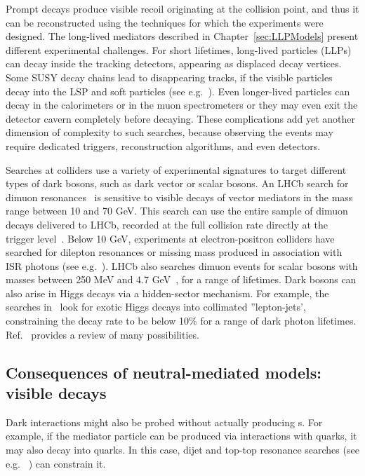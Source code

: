 Prompt decays produce visible recoil originating at the collision point, and thus it can be reconstructed using the techniques for which the experiments were designed.
The long-lived mediators described in Chapter~\ref{sec:LLPModels} present different experimental challenges. 
For short lifetimes, long-lived particles (LLPs) can decay inside the tracking detectors, appearing as displaced decay vertices. 
Some SUSY decay chains lead to disappearing tracks, if the visible particles decay into the LSP and soft particles (see e.g.~\cite{Aaboud:2017mpt, CMS:2014gxa}).
Even longer-lived particles can decay in the calorimeters or in the muon spectrometers
or they may even exit the detector cavern completely before decaying. 
These complications add yet another dimension of complexity to such searches, because observing the events may require dedicated triggers, reconstruction algorithms, and even detectors\cite{Ball:2016zrp,Chou:2016lxi}. 

Searches at colliders use a variety of experimental signatures to target different types of dark bosons, such as dark vector or scalar bosons.
An LHCb search for dimuon resonances~\cite{Aaij:2017rft} is sensitive to visible decays of vector mediators in the mass range between 10 and 70 GeV.
This search can use the entire sample of dimuon decays delivered to LHCb, recorded at the full collision rate directly at the trigger level~\cite{Aaij:2016rxn}. 
Below 10 GeV, experiments at electron-positron colliders have searched for dilepton resonances or missing mass produced in association with ISR photons (see e.g.~\cite{Lees:2014xha,Lees:2017lec}).
LHCb also searches dimuon events for scalar bosons with masses between 250 MeV and 4.7 GeV~\cite{Aaij:2016qsm}, for a range of lifetimes.
Dark bosons can also arise in Higgs decays via a hidden-sector mechanism.
For example, the searches in~\cite{ATLAS:2016jza,CMS-PAS-HIG-16-035} look for exotic Higgs decays into collimated ''lepton-jets', constraining the decay rate to be below 10\% for a range of dark photon lifetimes. 
Ref.~\cite{Curtin:2014cca} provides a review of many possibilities.

\subsection{Consequences of neutral-mediated models: visible decays}
\label{sec:MediatorSearches}
\label{sub:twoBody}

Dark interactions might also be probed without actually producing {\IP}s.
For example, if the mediator particle can be produced via interactions with quarks, it may also decay into quarks. 
In this case, dijet and top-top resonance searches (see e.g. ~\cite{Liew:2016oon,Chala:2015ama}) can constrain it.

